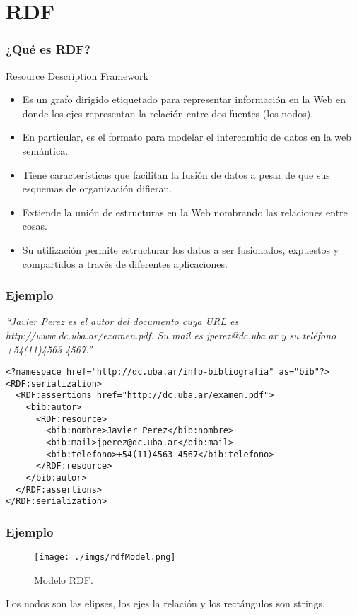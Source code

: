 \documentclass{beamer}
\begin{document}
\section{RDF}
\begin{frame}[fragile] %
\frametitle{¿Qué es RDF?}
\begin{block}{Resource Description Framework}
\begin{itemize}
\item<1-> Es un grafo dirigido etiquetado para representar información en la Web en donde los ejes representan la relación entre dos fuentes (los nodos).
\item<2-> En particular, es el formato para modelar el intercambio de datos en la web semántica. 
\item<3-> Tiene características que facilitan la fusión de datos a pesar de que sus esquemas de organización difieran.
\item<4-> Extiende la unión de estructuras en la Web nombrando las relaciones entre cosas.
\item<5-> Su utilización permite estructurar los datos a ser fusionados, expuestos y compartidos a través de diferentes aplicaciones.
\end{itemize}
\end{block}
\end{frame}

\begin{frame}[fragile]
\frametitle{Ejemplo}
\textit{``Javier Perez es el autor del documento cuya URL es http://www.dc.uba.ar/examen.pdf. Su mail es jperez@dc.uba.ar y su teléfono +54(11)4563-4567.''}
\begin{verbatim}
<?namespace href="http://dc.uba.ar/info-bibliografia" as="bib"?> 
<RDF:serialization> 
  <RDF:assertions href="http://dc.uba.ar/examen.pdf"> 
    <bib:autor> 
      <RDF:resource> 
        <bib:nombre>Javier Perez</bib:nombre> 
        <bib:mail>jperez@dc.uba.ar</bib:mail> 
        <bib:telefono>+54(11)4563-4567</bib:telefono> 
      </RDF:resource> 
    </bib:autor> 
  </RDF:assertions> 
</RDF:serialization>

\end{verbatim}
\end{frame}

\begin{frame}[fragile]
\frametitle{Ejemplo} 
\begin{center}
\begin{figure}[H] %
\texttt{[image: ./imgs/rdfModel.png]}
\caption{Modelo RDF.}
\end{figure}
Los nodos son las elipses, los ejes la relación y los rectángulos son strings.
\end{center}
\end{frame}
\end{document}
